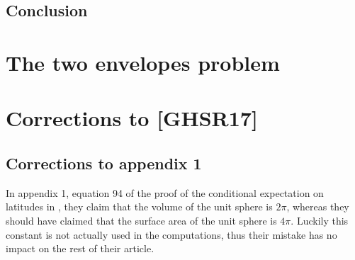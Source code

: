 \documentclass[a4paper]{report}
\theoremstyle{plain}
\theoremstyle{definition}
\theoremstyle{remark}
\numberwithin{equation}{chapter}
\DeclareMathOperator{\1}{\mathbbm{1}}
\begin{document}
\section{Conclusion}

\chapter{The two envelopes problem}\label{chap:TwoEnvelope}




\appendix
\chapter{Corrections to [GHSR17]}
\section{Corrections to appendix 1}\label{app:CorLong}
In appendix 1, equation 94 of the proof of the conditional expectation on latitudes in \cite{Gyenis17}, they claim that the volume of the unit sphere is $2\pi$, whereas they should have claimed that the surface area of the unit sphere is $4\pi$. Luckily this constant is not actually used in the computations, thus their mistake has no impact on the rest of their article.
\end{document}

